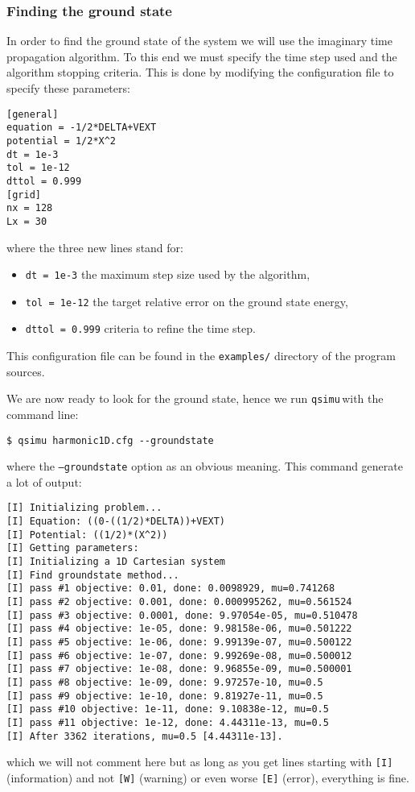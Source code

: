 \documentclass[12pt,a4paper]{report}
\newcommand{\qsimu}{\texttt{qsimu}\,}
\begin{document}
\subsubsection{Finding the ground state}
In order to find the ground state of the system we will use the imaginary time propagation algorithm.
To this end we must specify the time step used and the algorithm stopping criteria.
This is done by modifying the configuration file to specify these parameters:
\begin{verbatim}
[general]
equation = -1/2*DELTA+VEXT
potential = 1/2*X^2
dt = 1e-3
tol = 1e-12
dttol = 0.999
[grid]
nx = 128
Lx = 30
\end{verbatim}
where the three new lines stand for:
\begin{itemize}
\item\texttt{dt = 1e-3} the maximum step size used by the algorithm,
\item\texttt{tol = 1e-12} the target relative error on the ground state energy,
\item\texttt{dttol = 0.999} criteria to refine the time step.
\end{itemize}
This configuration file can be found in the \texttt{examples/} directory of the program sources.

We are now ready to look for the ground state, hence we run \qsimu with the command line:
\begin{verbatim}
$ qsimu harmonic1D.cfg --groundstate
\end{verbatim}
where the \texttt{--groundstate} option as an obvious meaning.
This command generate a lot of output:
\begin{verbatim}
[I] Initializing problem...
[I] Equation: ((0-((1/2)*DELTA))+VEXT)
[I] Potential: ((1/2)*(X^2))
[I] Getting parameters:
[I] Initializing a 1D Cartesian system
[I] Find groundstate method...
[I]	pass #1 objective: 0.01, done: 0.0098929, mu=0.741268
[I]	pass #2 objective: 0.001, done: 0.000995262, mu=0.561524
[I]	pass #3 objective: 0.0001, done: 9.97054e-05, mu=0.510478
[I]	pass #4 objective: 1e-05, done: 9.98158e-06, mu=0.501222
[I]	pass #5 objective: 1e-06, done: 9.99139e-07, mu=0.500122
[I]	pass #6 objective: 1e-07, done: 9.99269e-08, mu=0.500012
[I]	pass #7 objective: 1e-08, done: 9.96855e-09, mu=0.500001
[I]	pass #8 objective: 1e-09, done: 9.97257e-10, mu=0.5
[I]	pass #9 objective: 1e-10, done: 9.81927e-11, mu=0.5
[I]	pass #10 objective: 1e-11, done: 9.10838e-12, mu=0.5
[I]	pass #11 objective: 1e-12, done: 4.44311e-13, mu=0.5
[I] After 3362 iterations, mu=0.5 [4.44311e-13].
\end{verbatim}
which we will not comment here but as long as you get lines starting with \texttt{[I]} (information) and not \texttt{[W]} (warning) or even worse \texttt{[E]} (error), everything is fine.
\end{document}
